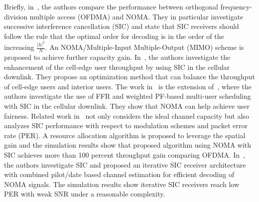 Briefly,
in~\cite{cite_docomo1}, the authors compare the performance between orthogonal frequency-division multiple access (OFDMA) and NOMA. They in particular investigate successive interference cancellation (SIC) and state that SIC receivers should follow the rule that the optimal order for decoding is in the order of the increasing $\frac{|h|^2}{N}$. An NOMA/Multiple-Input Multiple-Output (MIMO) scheme is proposed to achieve further capacity gain. In~\cite{cite_docomo2}, the authors investigate the enhancement of the cell-edge user throughput by using SIC in  the cellular downlink. They propose an optimization method that can balance the throughput of cell-edge users and interior users. The work in~\cite{cite_docomo3} is the extension of~\cite{cite_docomo2}, where the authors investigate the use of FFR and weighted PF-based multi-user scheduling with SIC in the cellular downlink. They show that NOMA can help achieve user fairness.
%
Related work in~\cite{cite_bell1} not only considers the ideal channel capacity but also analyzes SIC performance with respect to modulation schemes and packet error rate (PER). A resource allocation algorithm is proposed to leverage the spatial gain {\color{red}and the simulation results show that proposed algorithm using NOMA with SIC achieves more than 100 percent throughput gain comparing OFDMA. In~\cite{cite_bell2}, the authors investigate SIC and proposed an iterative SIC receiver architecture with combined pilot/date based channel estimation for efficient decoding of NOMA signals. The simulation results show iterative SIC receivers reach low PER with weak SNR under a reasonable complexity.}

